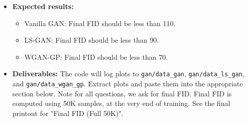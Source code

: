 \documentclass[11pt,addpoints,answers]{exam}
\numberwithin{equation}{section} %
\numberwithin{figure}{section} %
\numberwithin{table}{section} %
\begin{document}
\begin{itemize}
\begin{itemize}
\begin{minipage}[t]{\linewidth}
          \end{minipage}
    \end{itemize}
\item \textbf{Expected results:}
    \begin{itemize}
        \item Vanilla GAN: Final FID should be less than 110.
        \item LS-GAN: Final FID should be less than 90.
        \item WGAN-GP: Final FID should be less than 70.
    \end{itemize}
\item \textbf{Deliverables:} The code will log plots to \texttt{gan/data\_gan}, \texttt{gan/data\_ls\_gan}, and \texttt{gan/data\_wgan\_gp}. Extract plots and paste them into the appropriate section below. Note for all questions, we ask for final FID. Final FID is computed using 50K samples, at the very end of training. See the final printout for "Final FID  (Full 50K)". 
\end{itemize}
\newpage
\end{document}
